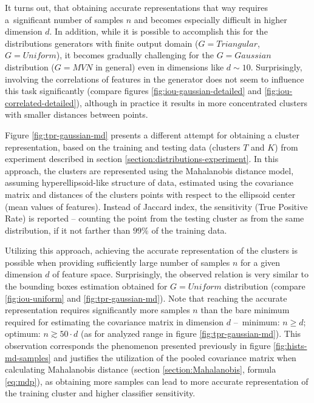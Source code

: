 It turns out, that obtaining accurate representations that way requires a~significant number of samples $n$ and becomes especially difficult in higher dimension $d$. In addition, while it is possible to accomplish this for the distributions generators with finite output domain ($G = Triangular$, $G = Uniform$), it becomes gradually challenging for the $G = Gaussian$ distribution ($G = MVN$ in general) even in dimensions like $d \sim 10$. Surprisingly, involving the correlations of features in the generator does not seem to influence this task significantly (compare figures \ref{fig:iou-gaussian-detailed} and \ref{fig:iou-correlated-detailed}), although in practice it results in more concentrated clusters with smaller distances between points.

Figure \ref{fig:tpr-gaussian-md} presents a different attempt for obtaining a cluster representation, based on the training and testing data (clusters $T$ and $K$) from experiment described in section \ref{section:distributions-experiment}. In this approach, the clusters are represented using the Mahalanobis distance model, assuming hyperellipsoid-like structure of data, estimated using the covariance matrix and distances of the clusters points with respect to the ellipsoid center (mean values of features). Instead of Jaccard index, the sensitivity (True Positive Rate) is reported – counting the point from the testing cluster as from the same distribution, if it not farther than $99\%$ of the training data.

Utilizing this approach, achieving the accurate representation of the clusters is possible when providing sufficiently large number of samples $n$ for a given dimension $d$ of feature space. Surprisingly, the observed relation is very similar to the bounding boxes estimation obtained for $G = Uniform$ distribution (compare \ref{fig:iou-uniform} and \ref{fig:tpr-gaussian-md}). Note that reaching the accurate representation requires significantly more samples $n$ than the bare minimum required for estimating the covariance matrix in dimension $d$ –~minimum: $n \geq d$; optimum: $n \gtrsim 50 \cdot d$ (as for analyzed range in figure \ref{fig:tpr-gaussian-md}). This observation corresponds the phenomenon presented previously in figure \ref{fig:hists-md-samples} and justifies the utilization of the pooled covariance matrix when calculating Mahalanobis distance (section \ref{section:Mahalanobis}, formula \ref{eq:mdp}), as obtaining more samples can lead to more accurate representation of the training cluster and higher classifier sensitivity.

